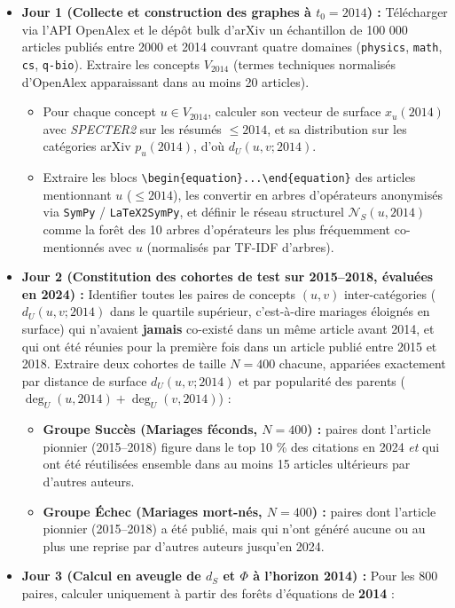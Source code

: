 \documentclass[a4paper,11pt]{article}
\providecommand{\tightlist}{\setlength{\itemsep}{0pt}\setlength{\parskip}{0pt}}
\begin{document}
\begin{itemize}
\tightlist
\item
  \textbf{Jour 1 (Collecte et construction des graphes à \(t_0 = 2014\))
  :} Télécharger via l'API OpenAlex et le dépôt bulk d'arXiv un
  échantillon de 100 000 articles publiés entre 2000 et 2014 couvrant
  quatre domaines (\texttt{physics}, \texttt{math}, \texttt{cs},
  \texttt{q-bio}). Extraire les concepts \(V_{2014}\) (termes techniques
  normalisés d'OpenAlex apparaissant dans au moins 20 articles).

  \begin{itemize}
  \tightlist
  \item
    Pour chaque concept \(u \in V_{2014}\), calculer son vecteur de
    surface \(x_u(2014)\) avec \emph{SPECTER2} sur les résumés
    \(\le 2014\), et sa distribution sur les catégories arXiv
    \(p_u(2014)\), d'où \(d_U(u,v;2014)\).
  \item
    Extraire les blocs
    \texttt{\textbackslash{}begin\{equation\}...\textbackslash{}end\{equation\}}
    des articles mentionnant \(u\) (\(\le 2014\)), les convertir en
    arbres d'opérateurs anonymisés via \texttt{SymPy} /
    \texttt{LaTeX2SymPy}, et définir le réseau structurel
    \(\mathcal{N}_S(u, 2014)\) comme la forêt des 10 arbres d'opérateurs
    les plus fréquemment co-mentionnés avec \(u\) (normalisés par TF-IDF
    d'arbres).
  \end{itemize}
\item
  \textbf{Jour 2 (Constitution des cohortes de test sur 2015--2018,
  évaluées en 2024) :} Identifier toutes les paires de concepts
  \((u,v)\) inter-catégories (\(d_U(u,v;2014)\) dans le quartile
  supérieur, c'est-à-dire mariages éloignés en surface) qui n'avaient
  \textbf{jamais} co-existé dans un même article avant 2014, et qui ont
  été réunies pour la première fois dans un article publié entre 2015 et
  2018. Extraire deux cohortes de taille \(N = 400\) chacune, appariées
  exactement par distance de surface \(d_U(u,v;2014)\) et par popularité
  des parents (\(\deg_U(u,2014) + \deg_U(v,2014)\)) :

  \begin{itemize}
  \tightlist
  \item
    \textbf{Groupe Succès (Mariages féconds, \(N=400\)) :} paires dont
    l'article pionnier (2015--2018) figure dans le top 10 \% des
    citations en 2024 \emph{et} qui ont été réutilisées ensemble dans au
    moins 15 articles ultérieurs par d'autres auteurs.
  \item
    \textbf{Groupe Échec (Mariages mort-nés, \(N=400\)) :} paires dont
    l'article pionnier (2015--2018) a été publié, mais qui n'ont généré
    aucune ou au plus une reprise par d'autres auteurs jusqu'en 2024.
  \end{itemize}
\item
  \textbf{Jour 3 (Calcul en aveugle de \(d_S\) et \(\Phi\) à l'horizon
  2014) :} Pour les 800 paires, calculer uniquement à partir des forêts
  d'équations de \textbf{2014} :


\end{itemize}
\end{document}
